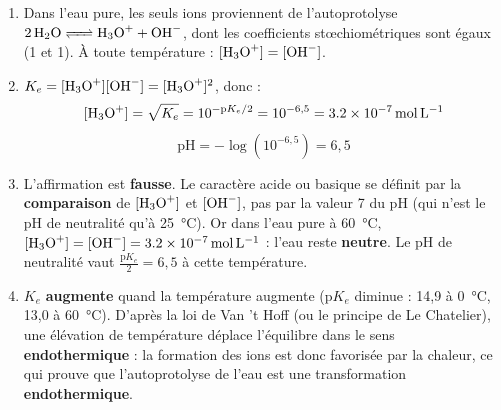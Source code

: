 \documentclass[11pt]{article}
\begin{document}
\begin{corrige}
\begin{enumerate}
    \item Dans l'eau pure, les seuls ions proviennent de l'autoprotolyse $\ce{2 H2O <=> H3O+ + OH-}$, dont les coefficients stœchiométriques sont égaux (1 et 1). À toute température : $[\ce{H3O+}] = [\ce{OH-}]$.
    \item $K_e = [\ce{H3O+}][\ce{OH-}] = [\ce{H3O+}]^2$, donc :
    \[ [\ce{H3O+}] = \sqrt{K_e} = 10^{-\text{p}K_e/2} = 10^{-6,5} = \SI{3,2e-7}{mol.L^{-1}} \]
    \[ \text{pH} = -\log(10^{-6,5}) = 6{,}5 \]
    \item L'affirmation est \textbf{fausse}. Le caractère acide ou basique se définit par la \textbf{comparaison} de $[\ce{H3O+}]$ et $[\ce{OH-}]$, pas par la valeur 7 du pH (qui n'est le pH de neutralité qu'à \SI{25}{\celsius}). Or dans l'eau pure à \SI{60}{\celsius}, $[\ce{H3O+}] = [\ce{OH-}] = \SI{3,2e-7}{mol.L^{-1}}$ : l'eau reste \textbf{neutre}. Le pH de neutralité vaut $\frac{\text{p}K_e}{2} = 6{,}5$ à cette température.
    \item $K_e$ \textbf{augmente} quand la température augmente (p$K_e$ diminue : 14,9 à \SI{0}{\celsius}, 13,0 à \SI{60}{\celsius}). D'après la loi de Van 't Hoff (ou le principe de Le Chatelier), une élévation de température déplace l'équilibre dans le sens \textbf{endothermique} : la formation des ions est donc favorisée par la chaleur, ce qui prouve que l'autoprotolyse de l'eau est une transformation \textbf{endothermique}.
\end{enumerate}
\end{corrige}
\end{document}
